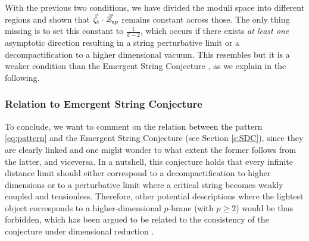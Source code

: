 With the previous two conditions, we have divided the moduli space into different regions and shown that  $\vec{\zeta}_{\rm t}\cdot\vec{\mathcal{Z}}_{\rm sp}$  remains constant across those. The only thing missing is to set this constant to  $\frac{1}{d-2}$, which occurs if there exists \emph{at least one} asymptotic direction resulting in a string perturbative limit or a decompactification to a higher dimensional vacuum. This resembles but it is a weaker condition than the Emergent String Conjecture \cite{Lee:2019wij}, as we explain in the following.

\subsubsection*{Relation to Emergent String Conjecture}

To conclude, we want to comment on the relation between the pattern \eqref{eq:pattern} and the Emergent String Conjecture (see Section \ref{s:SDC}), since they are clearly linked and one might wonder to what extent the former follows from the latter, and viceversa. In a nutshell, this conjecture holds that every infinite distance limit should either correspond to a decompactification to higher dimensions or to a perturbative limit where a critical string becomes weakly coupled and tensionless. Therefore, other potential descriptions where the lightest object corresponds to a higher-dimensional $p$-brane (with $p \geq 2$) would be thus forbidden, which has been argued to be related to the consistency of the conjecture under dimensional reduction \cite{Alvarez-Garcia:2021pxo}.
	
